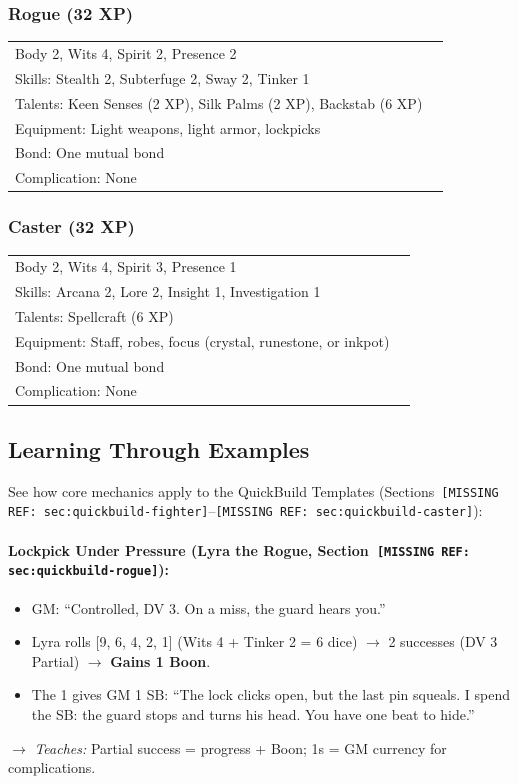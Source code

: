 \subsubsection{Rogue (32 XP)}
\begin{tabular}{@{}ll@{}}
Body 2, Wits 4, Spirit 2, Presence 2 \\
Skills: Stealth 2, Subterfuge 2, Sway 2, Tinker 1 \\
Talents: Keen Senses (2 XP), Silk Palms (2 XP), Backstab (6 XP) \\
Equipment: Light weapons, light armor, lockpicks \\
Bond: One mutual bond \\
Complication: None \\
\end{tabular}

\subsubsection{Caster (32 XP)}
\begin{tabular}{@{}ll@{}}
Body 2, Wits 4, Spirit 3, Presence 1 \\
Skills: Arcana 2, Lore 2, Insight 1, Investigation 1 \\
Talents: Spellcraft (6 XP) \\
Equipment: Staff, robes, focus (crystal, runestone, or inkpot) \\
Bond: One mutual bond \\
Complication: None \\
\end{tabular}

\subsection{Learning Through Examples}

See how core mechanics apply to the QuickBuild Templates (Sections~\texttt{[MISSING REF: sec:quickbuild-fighter]}--\texttt{[MISSING REF: sec:quickbuild-caster]}):

\paragraph{Lockpick Under Pressure (Lyra the Rogue, Section~\texttt{[MISSING REF: sec:quickbuild-rogue]}):}
\begin{itemize}
  \item GM: ``Controlled, DV 3. On a miss, the guard hears you.''
  \item Lyra rolls [9, 6, 4, 2, 1] (Wits 4 + Tinker 2 = 6 dice) $\rightarrow$ 2 successes (DV 3 Partial) $\rightarrow$ \textbf{Gains 1 Boon}.
  \item The 1 gives GM 1 SB: ``The lock clicks open, but the last pin squeals. I spend the SB: the guard stops and turns his head. You have one beat to hide.''
\end{itemize}
$\rightarrow$ \textit{Teaches:} Partial success = progress + Boon; 1s = GM currency for complications.

